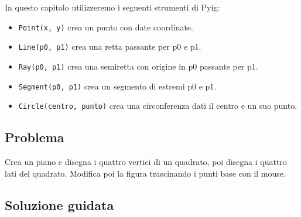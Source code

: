 In questo capitolo utilizzeremo i seguenti strumenti di Pyig:
\begin{itemize} [noitemsep]
\item \texttt{Point(x, y)} crea un punto con date coordinate.
\item \texttt{Line(p0, p1)} crea una retta passante per p0 e p1.
\item \texttt{Ray(p0, p1)} crea una semiretta con origine in p0 passante per p1.
\item \texttt{Segment(p0, p1)} crea un segmento di estremi p0 e p1.
\item \texttt{Circle(centro, punto)} crea una circonferenza dati il centro e 
un suo punto.

\end{itemize}


\subsection{Problema}

Crea un piano e disegna i quattro vertici di un quadrato, poi
disegna i quattro lati del quadrato.
Modifica poi la figura trascinando i punti base con il mouse.

\subsection{Soluzione guidata}

